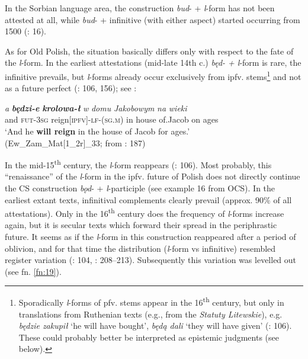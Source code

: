 \documentclass[output=paper,colorlinks,citecolor=brown]{langscibook}
\begin{document}
In the Sorbian language area, the construction \textit{bud}- + \textit{l}-form has not been attested at all, while \textit{bud}- + infinitive (with either aspect) started occurring from 1500 (\cite{andersen_2006b}: 16).

As for Old Polish, the situation basically differs only with respect to the fate of the \textit{l}-form. In the earliest attestations (mid-late 14th c.) \textit{będ- + l}-form is rare, the infinitive prevails, but \textit{l}-forms already occur exclusively from ipfv. stems\footnote{Sporadically \textit{l}-forms of pfv. stems appear in the 16\textsuperscript{th} century, but only in translations from Ruthenian texts (e.g., from the \textit{Statuty Litewskie}), e.g. \textit{będzie zakupił }‘he will have bought’,\textit{ będą dali} ‘they will have given’ (\cite{Křížková1960}: 106). These could probably better be interpreted as epistemic judgments (see below).} and not as a future perfect (\cite{Křížková1960}: 106, 156); see :

\ea \label{ex:wiemer:17}
    \gll \textit{a} \textit{\textbf{będzi-e}} \textit{\textbf{krolowa-ł}} \textit{w} \textit{domu} \textit{Jakobowym} \textit{na} \textit{wieki}\\
         and \textsc{fut-3sg} reign[\textsc{ipfv}]-\textsc{lf-(sg.m)} in house of.Jacob on ages\\
    \glt ‘And he \textbf{will reign} in the house of Jacob for ages.’\\
    \hfill (Ew\_Zam\_Mat[1\_2r]\_33; from \cite{Błaszczak2019}: 187)
\z

In the mid-15\textsuperscript{th} century, the \textit{l}-form reappears (\cite{Křížková1960}: 106). Most probably, this “renaissance” of the \textit{l}-form in the ipfv. future of Polish does not directly continue the CS construction \textit{bǫd}- + \textit{l}-participle (see example 16 from OCS). In the earliest extant texts, infinitival complements clearly prevail (approx. 90\% of all attestations). Only in the 16\textsuperscript{th} century does the frequency of \textit{l}-forms increase again, but it is secular texts which forward their spread in the periphrastic future. It seems as if the \textit{l}-form in this construction reappeared after a period of oblivion, and for that time the distribution (\textit{l}-form vs infinitive) resembled register variation (\cite{Křížková1960}: 104, \cite{Błaszczak2019}: 208--213). Subsequently this variation was levelled out (see fn. \ref{fn:19}).
\end{document}
